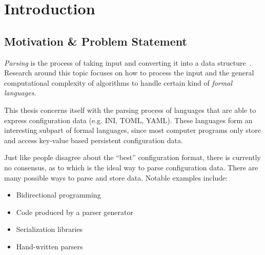 \documentclass[draft, oneside, final]{vutinfth}
\begin{document}
\frontmatter

\addstatementpage


\tableofcontents

\mainmatter

\chapter{Introduction}

\section{Motivation \& Problem Statement}
\label{sec:Motivation}

\begin{sloppypar}
\emph{Parsing} is the process of taking input and converting it into a data structure~\cite{wikipedia2016Parser, grune2007parsing}. Research around this topic focuses on how to process the input and the general computational complexity of algorithms to handle certain kind of \emph{formal languages}.
\end{sloppypar}

This thesis concerns itself with the parsing process of languages that are able to express configuration data (e.g. INI, TOML, YAML). These languages form an interesting subpart of formal languages, since most computer programs only store and access key-value based persistent configuration data.

Just like people disagree about the “best” configuration format, there is currently no consensus, as to which is the ideal way to parse configuration data. There are many possible ways to parse and store data. Notable examples include:

\begin{itemize}
  \item Bidirectional programming~\cite{foster2005combinators, bohannon2006relational, lutterkort2008augeas, ko2016bigul, raab2016improving}
  \item Code produced by a parser generator~\cite{denny2008ielr, parr2014adaptive, warth2016modular, bates2017aprt}
  \item Serialization libraries~\cite{sumaray2012cds, pacini2015performance}
  \item Hand-written parsers~\cite{myers2008cparser, bendersky2012clang}
\end{itemize}
\end{document}
